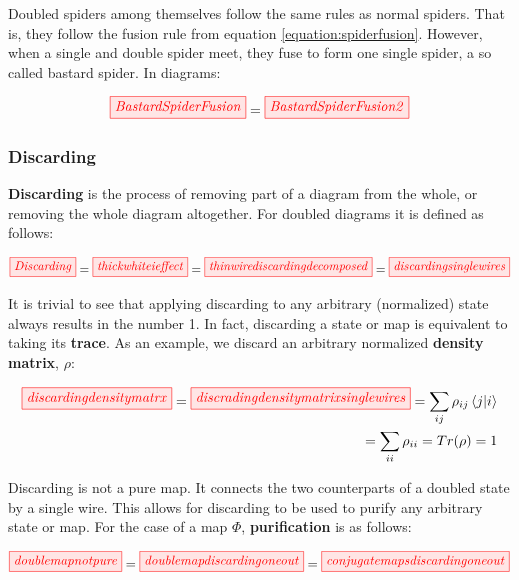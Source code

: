 \documentclass[]{article}
\begin{document}
Doubled spiders among themselves follow the same rules as normal spiders. That is, they follow the fusion rule from equation \ref{equation:spiderfusion}. However, when a single and double spider meet, they fuse to form one single spider, a so called bastard spider. In diagrams:

\begin{equation}
	\tikzfig{BastardSpiderFusion} = \tikzfig{BastardSpiderFusion2}
\end{equation}

\subsubsection{Discarding}
\label{discarding}

\textbf{Discarding} is the process of removing part of a diagram from the whole, or removing the whole diagram altogether. For doubled diagrams it is defined as follows:

\begin{equation}
\label{discarding}
\tikzfig{Discarding} = \tikzfig{thickwhiteieffect} = \tikzfig{thinwirediscardingdecomposed} = \tikzfig{discardingsinglewires} 
\end{equation}

It is trivial to see that applying discarding to any arbitrary (normalized) state always results in the number 1. In fact, discarding a state or map is equivalent to taking its \textbf{trace}. As an example, we discard an arbitrary normalized \textbf{density matrix}, $\rho$:

\begin{equation}
\label{equation:discarding}
\begin{split}
\tikzfig{discardingdensitymatrx} = \tikzfig{discradingdensitymatrixsinglewires} = \sum\limits_{ij} \rho_{ij} \bra{j}\ket{i} \\ = \sum\limits_{ii} \rho_{ii} = Tr(\rho) = 1
\end{split}
\end{equation}

Discarding is not a pure map. It connects the two counterparts of a doubled state by a single wire. This allows for discarding to be used to purify any arbitrary state or map. For the case of a map $\Phi$, \textbf{purification} is as follows:

\begin{equation}
\label{equation:Purification}
\tikzfig{doublemapnotpure} = \tikzfig{doublemapdiscardingoneout} = \tikzfig{conjugatemapsdiscardingoneout}
\end{equation}
\end{document}
